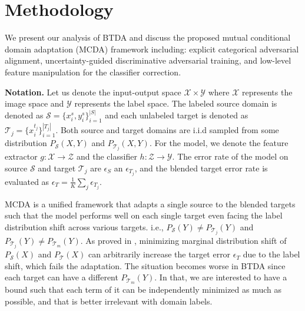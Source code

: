\documentclass[letterpaper]{article} \usepackage{aaai23}  \usepackage{times}  \usepackage{helvet}  \usepackage{courier}  \usepackage[hyphens]{url}  \usepackage{graphicx} \urlstyle{rm} \def\UrlFont{\rm}  \usepackage{natbib}  \usepackage{caption} \frenchspacing  \setlength{\pdfpagewidth}{8.5in}  \setlength{\pdfpageheight}{11in}
\begin{document}
\section{Methodology}
We present our analysis of BTDA and discuss the proposed mutual conditional domain adaptation (MCDA) framework including: explicit categorical adversarial alignment, uncertainty-guided discriminative adversarial training, and low-level feature manipulation for the classifier correction.

\noindent\textbf{Notation.} Let us denote the input-output space $\mathcal{X} \times \mathcal{Y}$ where $\mathcal{X}$ represents the image space and $\mathcal{Y}$ represents the label space. The labeled source domain is denoted as $\mathcal{S}=\{x_i^s, y_i^s \}^{|S|}_{i=1}$ and each unlabeled target is denoted as $\mathcal{T}_j=\{x_i^{t_j} \}^{|T_j|}_{i=1}$. Both source and target domains are i.i.d sampled from some distribution $P_{\mathcal{S}}(X, Y)$ and $P_{\mathcal{T}_j}(X, Y)$. For the model, we denote the feature extractor $g: \mathcal{X} \to \mathcal{Z}$ and the classifier $h: \mathcal{Z} \to \mathcal{Y}$. The error rate of the model on source $\mathcal{S}$ and target $\mathcal{T}_j$ are $\epsilon_S$ an $\epsilon_{T_j}$, and the blended target error rate is evaluated as $\epsilon_T = \frac{1}{K} \sum_{j} \epsilon_{T_j}$.

MCDA is a unified framework that adapts a single source to the blended targets such that the model performs well on each single target even facing the label distribution shift across various targets. i.e., $P_{\mathcal{S}}(Y) \neq P_{\mathcal{T}_j}(Y)$ and $ P_{\mathcal{T}_j}(Y) \neq P_{\mathcal{T}_m}(Y)$.
As proved in \cite{tachet2020domain}, minimizing marginal distribution shift of $P_{\mathcal{S}}(X)$ and $P_{\mathcal{T}}(X)$ can arbitrarily increase the target error $\epsilon_T$ due to the label shift, which fails the adaptation. The situation becomes worse in BTDA since each target can have a different $P_{\mathcal{T}_m}(Y)$. In that, we are interested to have a bound such that each term of it can be independently minimized as much as possible, and that is better irrelevant with domain labels.
\end{document}
